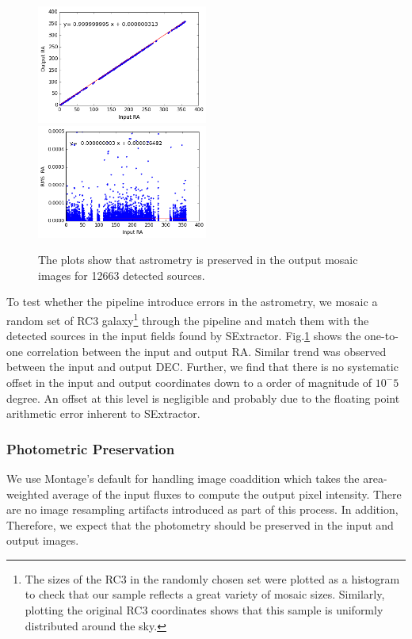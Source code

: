 \documentclass[authoryear, 12pt, 5p, times]{elsarticle}
\begin{document}
\begin{figure}[h]
\includegraphics[width=0.5\textwidth]{figures/ra.png}
\includegraphics[width=0.5\textwidth]{figures/ra_rms.png}
\caption{The plots show that astrometry is preserved in the output mosaic images for 12663 detected sources. }
\label{ra}
\end{figure}
To test whether the pipeline introduce errors in the astrometry, we mosaic a random set of RC3 galaxy\footnote{The sizes of the RC3 in the randomly chosen set were plotted as a histogram to check that our sample reflects a great variety of mosaic sizes. Similarly, plotting the original RC3 coordinates shows that this sample is uniformly distributed around the sky.} through the pipeline and match them with the detected sources in the input fields found by SExtractor.  Fig.\ref{ra} shows the one-to-one correlation between the input and output RA. Similar trend was observed between the input and output DEC. Further, we find that there is no systematic offset in the input and output coordinates down to a order of magnitude of $10^-5$ degree. An offset at this level is negligible and probably due to the floating point arithmetic error inherent to SExtractor.
\subsubsection{Photometric Preservation\label{photo}}

We use Montage's default for  handling image coaddition which takes the area-weighted average of the input fluxes to compute the output pixel intensity. There are no image resampling artifacts introduced as part of this process. In addition,
Therefore, we expect that the photometry should be preserved in the input and output images.
\end{document}

